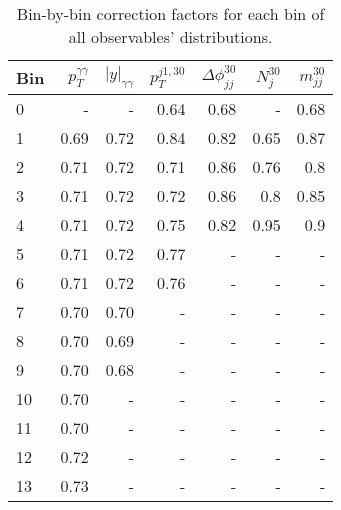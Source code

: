 \begin{table}[h]
\centering
\small
\caption{Bin-by-bin correction factors for each bin of all observables' distributions.}
\label{c_factors_table}
\begin{tabular}{l | rrrrrr}
Bin &  $p_T^{\gamma\gamma}$ & $|y|_{\gamma\gamma}$ & $p_T^{j1, 30}$ & $\Delta\phi_{jj}^{30}$ & $N_j^{30}$ & $m_{jj}^{30}$ \\
\hline
0 &					- & 				- & 				0.64 & 					0.68 & 			- & 			0.68 \\ 
1 &                  0.69 &                 0.72 &           0.84 &                   0.82 &       0.65 &          0.87 \\
2  &                  0.71 &                 0.72 &           0.71 &                   0.86 &       0.76 &           0.8 \\
3  &                  0.71 &                 0.72 &           0.72 &                   0.86 &        0.8 &          0.85 \\
4  &                  0.71 &                 0.72 &           0.75 &                   0.82 &       0.95 &           0.9 \\
5  &                  0.71 &                 0.72 &           0.77 &                      - &          - &             - \\
6  &                  0.71 &                 0.72 &           0.76 &                      - &          - &             - \\
7  &                  0.70 &                  0.70 &              - &                      - &          - &             - \\
8  &                  0.70 &                 0.69 &              - &                      - &          - &             - \\
9  &                  0.70 &                 0.68 &              - &                      - &          - &             - \\
10 &                  0.70 &                    - &              - &                      - &          - &             - \\
11 &                  0.70 &                    - &              - &                      - &          - &             - \\
12 &                  0.72 &                    - &              - &                      - &          - &             - \\
13 &                  0.73 &                    - &              - &                      - &          - &             - \\

\end{tabular}
\end{table}
